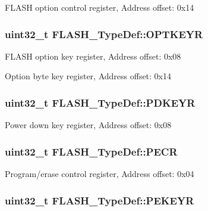 F\-L\-A\-S\-H option control register, Address offset\-: 0x14 \hypertarget{struct_f_l_a_s_h___type_def_a793cd13a4636c9785fdb99316f7fd7ab}{
\subsubsection[{O\-P\-T\-K\-E\-Y\-R}]{ uint32\-\_\-t F\-L\-A\-S\-H\-\_\-\-Type\-Def\-::\-O\-P\-T\-K\-E\-Y\-R}}\label{struct_f_l_a_s_h___type_def_a793cd13a4636c9785fdb99316f7fd7ab}
F\-L\-A\-S\-H option key register, Address offset\-: 0x08

Option byte key register, Address offset\-: 0x14 \hypertarget{struct_f_l_a_s_h___type_def_a17d6fcde53db4cb932b3fbfe08235b31}{
\subsubsection[{P\-D\-K\-E\-Y\-R}]{ uint32\-\_\-t F\-L\-A\-S\-H\-\_\-\-Type\-Def\-::\-P\-D\-K\-E\-Y\-R}}\label{struct_f_l_a_s_h___type_def_a17d6fcde53db4cb932b3fbfe08235b31}
Power down key register, Address offset\-: 0x08 \hypertarget{struct_f_l_a_s_h___type_def_a58afa3377dd5f4ffa93eb3da4c653cba}{
\subsubsection[{P\-E\-C\-R}]{ uint32\-\_\-t F\-L\-A\-S\-H\-\_\-\-Type\-Def\-::\-P\-E\-C\-R}}\label{struct_f_l_a_s_h___type_def_a58afa3377dd5f4ffa93eb3da4c653cba}
Program/erase control register, Address offset\-: 0x04 \hypertarget{struct_f_l_a_s_h___type_def_a3c470f54858e246365f56e5fe4d2a618}{
\subsubsection[{P\-E\-K\-E\-Y\-R}]{ uint32\-\_\-t F\-L\-A\-S\-H\-\_\-\-Type\-Def\-::\-P\-E\-K\-E\-Y\-R}}\label{struct_f_l_a_s_h___type_def_a3c470f54858e246365f56e5fe4d2a618}
